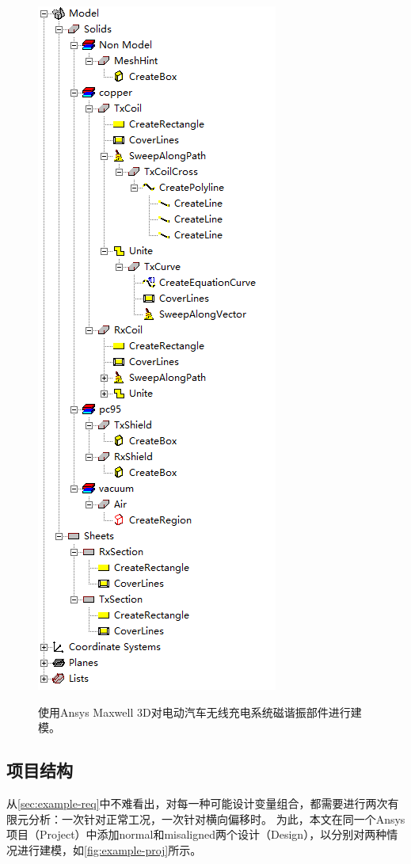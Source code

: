 \documentclass[index]{subfiles}
\begin{document}
\begin{figure}[h]
  \hspace{1em}
    {\includegraphics{./figures/example-model.png}}
  \caption[仿真文件的结构]{使用Ansys Maxwell 3D对电动汽车无线充电系统磁谐振部件进行建模。}
\end{figure}

\subsection{项目结构}\label{ssec:example-proj}
从\cref{sec:example-req}中不难看出，对每一种可能设计变量组合，都需要进行两次有限元分析：一次针对正常工况，一次针对横向偏移时。
为此，本文在同一个Ansys项目（Project）中添加normal和misaligned两个设计（Design），以分别对两种情况进行建模，如\cref{fig:example-proj}所示。
\end{document}
